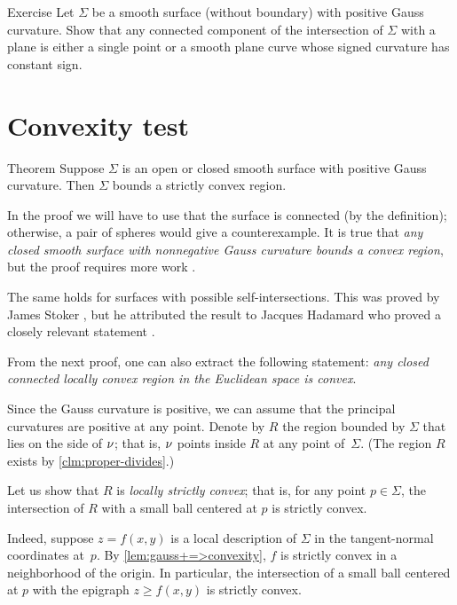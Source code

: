 \begin{thm}{Exercise}\label{ex:section-of-convex}
Let $\Sigma$ be a smooth surface (without boundary) with positive Gauss curvature.
Show that any connected component of the intersection of $\Sigma$ with a plane is either a single point or a smooth plane curve whose signed curvature has constant sign.
\end{thm}

\section{Convexity test}

\begin{thm}{Theorem}\label{thm:convex-embedded}
Suppose $\Sigma$ is an open or closed smooth surface with positive Gauss curvature.
Then $\Sigma$ bounds a strictly convex region.
\end{thm}

In the proof we will have to use that the surface is connected (by the definition);
otherwise, a pair of spheres would give a counterexample.
It is true that \textit{any closed smooth surface with nonnegative Gauss curvature bounds a convex region}, but the proof requires more work \cite{hadamard,gomes,sacksteder}.

The same holds for surfaces with possible self-intersections.
This was proved by James Stoker \cite{stoker}, but he attributed the result to Jacques Hadamard who proved a closely relevant statement \cite[§ 23]{hadamard}.

From the next proof, one can also extract the following statement: \textit{any closed connected locally convex region in the Euclidean space is convex}.

Since the Gauss curvature is positive, we can assume that the principal curvatures are positive at any point.
Denote by $R$ the region bounded by $\Sigma$ that lies on the side of $\nu$;
that is, $\nu$ points inside $R$ at any point of~$\Sigma$.
(The region $R$ exists by \ref{clm:proper-divides}.)

Let us show that $R$ is {}\emph{locally strictly convex};
that is, for any point $p\in \Sigma$, the intersection of $R$ with a small ball centered at $p$ is strictly convex.

Indeed, suppose $z=f(x,y)$ is a local description of $\Sigma$ in the tangent-normal coordinates at~$p$.
By \ref{lem:gauss+=>convexity}, $f$ is strictly convex in a neighborhood of the origin.
In particular, the intersection of a small ball centered at $p$ with the epigraph $z\ge f(x,y)$ is strictly convex.

